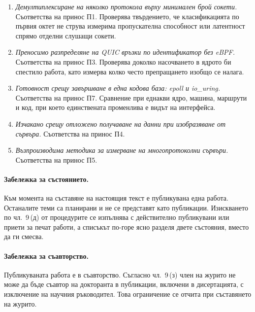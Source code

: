 \begin{enumerate}[leftmargin=*, resume]
  \item \emph{Демултиплексиране на няколко протокола върху минимален брой сокети.}
        Съответства на принос П1. Проверява твърдението, че класификацията по първия октет
        не струва измерима пропускателна способност или латентност спрямо отделни слушащи
        сокети.

  \item \emph{Преносимо разпределяне на QUIC връзки по идентификатор без eBPF.}
        Съответства на принос П3. Проверява доколко насочването в ядрото би спестило работа,
        като измерва колко често препращането изобщо се налага.

  \item \emph{Готовност срещу завършване в една кодова база: epoll и io\_uring.}
        Съответства на принос П7. Сравнение при еднакви ядро, машина, маршрути и код, при
        което единствената променлива е видът на интерфейса.

  \item \emph{Изчакано срещу отложено получаване на данни при изобразяване от сървъра.}
        Съответства на принос П4.

  \item \emph{Възпроизводима методика за измерване на многопротоколни сървъри.}
        Съответства на принос П5.
\end{enumerate}

\paragraph{Забележка за състоянието.} Към момента на съставяне на настоящия текст е
публикувана една работа. Останалите теми са планирани и не се представят като публикации.
Изискването по чл.~9\,(д) от процедурите се изпълнява с действително публикувани или приети
за печат работи, а списъкът по-горе ясно разделя двете състояния, вместо да ги смесва.

\paragraph{Забележка за съавторство.} Публикуваната работа е в съавторство. Съгласно
чл.~9\,(з) член на журито не може да бъде съавтор на докторанта в публикации, включени в
дисертацията, с изключение на научния ръководител. Това ограничение се отчита при
съставянето на журито.
